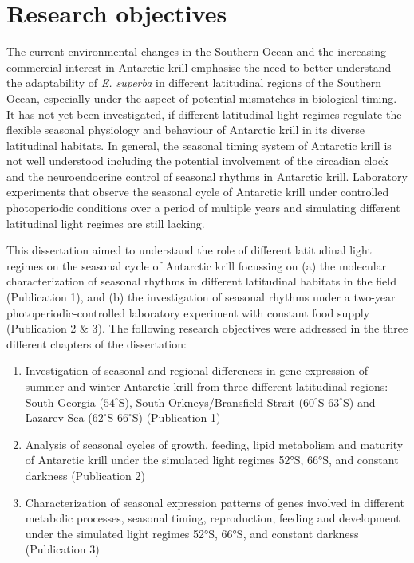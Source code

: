 \section{Research objectives}
The current environmental changes in the Southern Ocean and the increasing commercial interest in Antarctic krill emphasise the need to better understand the adaptability of \textit{E. superba} in different latitudinal regions of the Southern Ocean, especially under the aspect of potential mismatches in biological timing. It has not yet been investigated, if different latitudinal light regimes regulate the flexible seasonal physiology and behaviour of Antarctic krill in its diverse latitudinal habitats.  In general, the seasonal timing system of Antarctic krill is not well understood including the potential involvement of the circadian clock and the neuroendocrine control of seasonal rhythms in Antarctic krill. Laboratory experiments that observe the seasonal cycle of Antarctic krill under controlled photoperiodic conditions over a period of multiple years and simulating different latitudinal light regimes are still lacking.

This dissertation aimed to understand the role of different latitudinal light regimes on the seasonal cycle of Antarctic krill focussing on (a) the molecular characterization of seasonal rhythms in different latitudinal habitats in the field (Publication 1), and (b) the investigation of seasonal rhythms under a two-year photoperiodic-controlled laboratory experiment with constant food supply (Publication 2 \& 3). The following research objectives were addressed in the three different chapters of the dissertation:

\begin{enumerate}
\item Investigation of seasonal and regional differences in gene expression of summer and winter Antarctic krill from three different latitudinal regions: South Georgia ($54^{\circ}$S), South Orkneys/Bransfield Strait ($60^{\circ}$S-$63^{\circ}$S) and Lazarev Sea ($62^{\circ}$S-$66^{\circ}$S) (Publication 1)
\item Analysis of seasonal cycles of growth, feeding, lipid metabolism and maturity of Antarctic krill under the simulated light regimes 52°S, 66°S, and constant darkness (Publication 2)
\item Characterization of seasonal expression patterns of genes involved in different metabolic processes, seasonal timing, reproduction, feeding and development under the simulated light regimes 52°S, 66°S, and constant darkness (Publication 3)
\end{enumerate}

